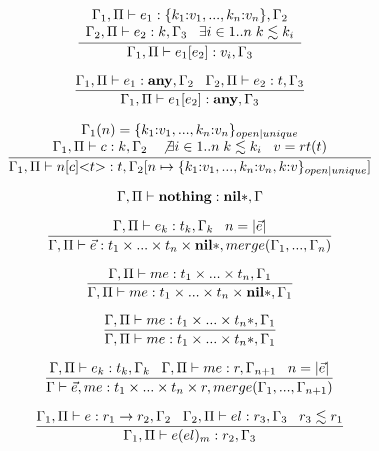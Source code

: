 \[
\dfrac{\begin{array}{c}
       \Gamma_{1}, \Pi \vdash e_{1}:\{k_{1}{:}v_{1}, ..., k_{n}{:}v_{n}\}, \Gamma_{2}\\
       \Gamma_{2}, \Pi \vdash e_{2}:k, \Gamma_{3} \;\;\;
       \exists i \in 1{..}n \; k \lesssim k_{i}
       \end{array}}
      {\Gamma_{1}, \Pi \vdash e_{1}[e_{2}]:v_{i}, \Gamma_{3}}
\]

\[
\dfrac{\Gamma_{1}, \Pi \vdash e_{1}:\mathbf{any}, \Gamma_{2} \;\;\;
       \Gamma_{2}, \Pi \vdash e_{2}:t, \Gamma_{3}}
      {\Gamma_{1}, \Pi \vdash e_{1}[e_{2}]:\mathbf{any}, \Gamma_{3}}
\]

\[
\dfrac{\begin{array}{c}
       \Gamma_{1}(n) = \{ k_{1}{:}v_{1}, ..., k_{n}{:}v_{n} \}_{open|unique}\\
       \Gamma_{1}, \Pi \vdash c:k, \Gamma_{2} \;\;\;
       \not \exists i \in 1..n \; k \lesssim k_{i} \;\;\;
       v = rt(t)
       \end{array}}
      {\Gamma_{1}, \Pi \vdash n[c] {<}t{>}:t, \Gamma_{2}[n \mapsto \{ k_{1}{:}v_{1}, ..., k_{n}{:}v_{n}, k{:}v\}_{open|unique}]}
\]

\[
\Gamma, \Pi \vdash \mathbf{nothing}:\mathbf{nil}{*}, \Gamma
\]

\[
\dfrac{\Gamma, \Pi \vdash e_{k}:t_{k}, \Gamma_{k} \;\;\;
       n = |\vec{e}|}
      {\Gamma, \Pi \vdash \vec{e}:t_{1} \times ... \times t_{n} \times \mathbf{nil}{*}, merge(\Gamma_{1}, ..., \Gamma_{n})}
\]

\[
\dfrac{\Gamma, \Pi \vdash me:t_{1} \times ... \times t_{n}, \Gamma_{1}}
      {\Gamma, \Pi \vdash me:t_{1} \times ... \times t_{n} \times \mathbf{nil}{*}, \Gamma_{1}}
\]

\[
\dfrac{\Gamma, \Pi \vdash me:t_{1} \times ... \times t_{n}{*}, \Gamma_{1}}
      {\Gamma, \Pi \vdash me:t_{1} \times ... \times t_{n}{*}, \Gamma_{1}}
\]

\[
\dfrac{\Gamma, \Pi \vdash e_{k}:t_{k}, \Gamma_{k} \;\;\;
       \Gamma, \Pi \vdash me:r, \Gamma_{n + 1} \;\;\;
       n = |\vec{e}|}
      {\Gamma \vdash \vec{e}, me:t_{1} \times ... \times t_{n} \times r, merge(\Gamma_{1}, ..., \Gamma_{n+1})}
\]

\[
\dfrac{\Gamma_{1}, \Pi \vdash e:r_{1} \rightarrow r_{2}, \Gamma_{2} \;\;\;
       \Gamma_{2}, \Pi \vdash el:r_{3}, \Gamma_{3} \;\;\;
       r_{3} \lesssim r_{1}}
      {\Gamma_{1}, \Pi \vdash e(el)_{m}:r_{2}, \Gamma_{3}}
\]

